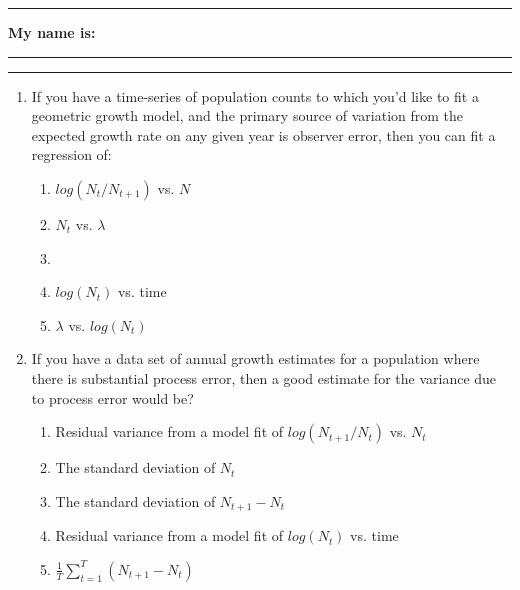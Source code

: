 \documentclass{article}
\newcommand*{\blanks}[1][4em]{\rule{#1}{.4pt}}
\begin{document}
\noindent{}

\rule[0.5ex]{\linewidth}{1pt}
\begin{center}
	\textbf{My name is:} \blanks[150pt]
\end{center}
\rule[0.5ex]{\linewidth}{1pt}

\begin{enumerate}
\item If you have a time-series of population counts to which you’d like to fit a geometric growth model, and the primary source of variation from the expected growth rate on any given year is observer error, then you can fit a regression of: 
\begin{enumerate}
	\item $log \left( N_t / N_{t+1} \right)$ vs. $N$
	\item $N_t$ vs. $\lambda$
	\item {}
	\item $log (N_t)$ vs. time
	\item $\lambda$ vs. $log (N_t)$
\end{enumerate}

\item If you have a data set of annual growth estimates for a population where there is substantial process error, then a good estimate for the variance due to process error would be?
\begin{enumerate}
	\item Residual variance from a model fit of $log(N_{t+1}/N_t)$ vs. $N_t$
	\item The standard deviation of $N_t$
	\item The standard deviation of $N_{t+1}-N_t$
	\item Residual variance from a model fit of $log(N_t)$ vs. time
	\item $\frac{1}{T}\sum_{t=1}^T\left( N_{t+1}-N_t \right)$
\end{enumerate}

\end{enumerate}
\vspace{1cm}
\end{document}
